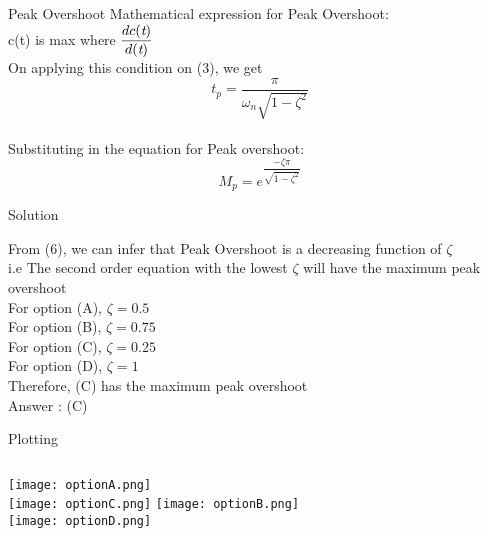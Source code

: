 \documentclass{beamer}
\begin{document}
\begin{frame}{Peak Overshoot}
Mathematical expression for Peak Overshoot:
\\c(t) is max where $\dfrac{dc(\emph{t})}{d(\emph{t})}$
\\On applying this condition on (3), we get
\begin{equation}
    t_p = \dfrac{\pi}{\omega_n\sqrt{1-\zeta^2}}
\end{equation}
\\Substituting in the equation for Peak overshoot:
\begin{equation}
    M_p = e^\dfrac{-\zeta\pi}{\sqrt{1-\zeta^2}}
\end{equation}
\end{frame}
\begin{frame}{Solution}
    \begin{flushleft}
    From (6), we can infer that Peak Overshoot is a decreasing function of $\zeta$
    \\i.e The second order equation with the lowest $\zeta$ will have the maximum peak overshoot
    \\For option (A), $\zeta = 0.5$
    \\For option (B), $\zeta = 0.75$
    \\For option (C), $\zeta = 0.25$
    \\For option (D), $\zeta = 1$
    \\Therefore, (C) has the maximum peak overshoot
    \\Answer : (C)
    \end{flushleft}
\end{frame}

\begin{frame}{Plotting}
\begin{columns}[t]
\centering
\texttt{[image: optionA.png]}\\
\texttt{[image: optionC.png]}
\centering
\texttt{[image: optionB.png]}\\
\texttt{[image: optionD.png]}
\end{columns}
\end{frame}
\end{document}
